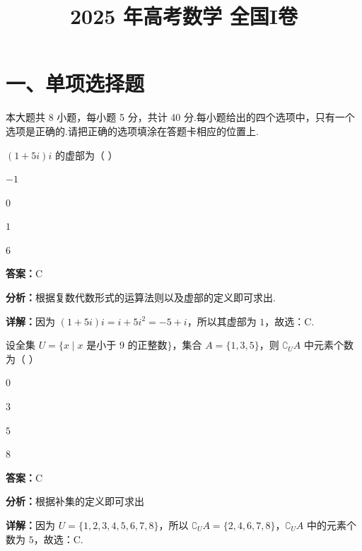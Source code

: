 ﻿\title{2025 年高考数学 全国I卷}
\date{}
\maketitle

\section*{一、单项选择题}
本大题共 8 小题，每小题 5 分，共计 40 分.每小题给出的四个选项中，只有一个选项是正确的.请把正确的选项填涂在答题卡相应的位置上.

\begin{question}[points=5]
$(1+5i)i$ 的虚部为（ ）
\begin{choices}
  \item $-1$
  \item $0$
  \item $1$
  \item $6$
\end{choices}
\begin{solution}
\textbf{答案：}C

\textbf{分析：}根据复数代数形式的运算法则以及虚部的定义即可求出.

\textbf{详解：}因为 $(1+5i)i = i + 5i^2 = -5 + i$，所以其虚部为 $1$，故选：C.
\end{solution}
\end{question}

\begin{question}[points=5]
设全集 $U = \{ x \mid x \text{ 是小于 } 9 \text{ 的正整数} \}$，集合 $A = \{1,3,5\}$，则 $\complement_U A$ 中元素个数为（ ）
\begin{choices}
  \item $0$
  \item $3$
  \item $5$
  \item $8$
\end{choices}
\begin{solution}
\textbf{答案：}C

\textbf{分析：}根据补集的定义即可求出

\textbf{详解：}因为 $U = \{1,2,3,4,5,6,7,8\}$，所以 $\complement_U A = \{2,4,6,7,8\}$，$\complement_U A$ 中的元素个数为 $5$，故选：C.
\end{solution}
\end{question}


